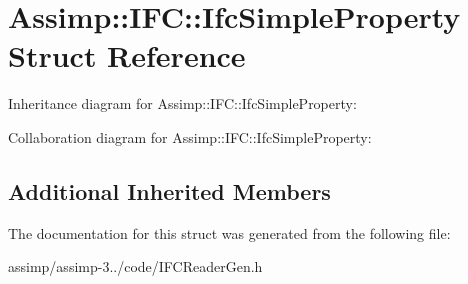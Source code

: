 \hypertarget{struct_assimp_1_1_i_f_c_1_1_ifc_simple_property}{\section{Assimp\+:\+:I\+F\+C\+:\+:Ifc\+Simple\+Property Struct Reference}
\label{struct_assimp_1_1_i_f_c_1_1_ifc_simple_property}
}


Inheritance diagram for Assimp\+:\+:I\+F\+C\+:\+:Ifc\+Simple\+Property\+:


Collaboration diagram for Assimp\+:\+:I\+F\+C\+:\+:Ifc\+Simple\+Property\+:
\subsection*{Additional Inherited Members}


The documentation for this struct was generated from the following file\+:\begin{DoxyCompactItemize}
\item 
assimp/assimp-\/3../code/I\+F\+C\+Reader\+Gen.\+h\end{DoxyCompactItemize}
